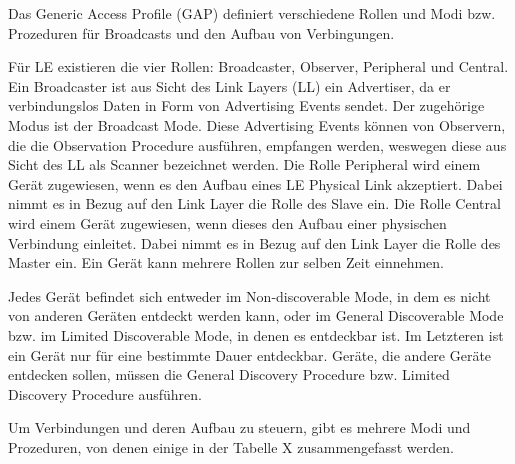 Das Generic Access Profile (GAP) definiert verschiedene Rollen und Modi bzw. Prozeduren für Broadcasts und den Aufbau von Verbingungen.

Für LE existieren die vier Rollen: Broadcaster, Observer, Peripheral und Central. Ein Broadcaster ist aus Sicht des Link Layers (LL) ein Advertiser, da er verbindungslos Daten in Form von Advertising Events sendet. Der zugehörige Modus ist der Broadcast Mode. Diese Advertising Events können von Observern, die die Observation Procedure ausführen, empfangen werden, weswegen diese aus Sicht des LL als Scanner bezeichnet werden. Die Rolle Peripheral wird einem Gerät zugewiesen, wenn es den Aufbau eines LE Physical Link akzeptiert. Dabei nimmt es in Bezug auf den Link Layer die Rolle des Slave ein. Die Rolle Central wird einem Gerät zugewiesen, wenn dieses den Aufbau einer physischen Verbindung einleitet. Dabei nimmt es in Bezug auf den Link Layer die Rolle des Master ein. Ein Gerät kann mehrere Rollen zur selben Zeit einnehmen. \cite{BtSpec4.0_1638-1639} \cite{BtSpec4.0_1695-1697}

Jedes Gerät befindet sich entweder im Non-discoverable Mode, in dem es nicht von anderen Geräten entdeckt werden kann, oder im General Discoverable Mode bzw. im Limited Discoverable Mode, in denen es entdeckbar ist. Im Letzteren ist ein Gerät nur für eine bestimmte Dauer entdeckbar. Geräte, die andere Geräte entdecken sollen, müssen die General Discovery Procedure bzw. Limited Discovery Procedure ausführen. \cite{BtSpec4.0_1697}

Um Verbindungen und deren Aufbau zu steuern, gibt es mehrere Modi und Prozeduren, von denen einige in der Tabelle X zusammengefasst werden.

